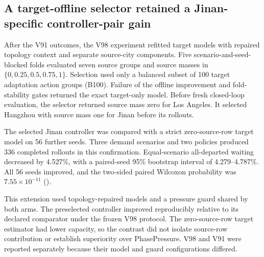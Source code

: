 \subsection{A target-offline selector retained a Jinan-specific controller-pair gain}

After the V91 outcomes, the V98 experiment refitted target models with repaired
topology context and separate source-city components.  Five
scenario-and-seed-blocked folds evaluated seven source groups and source masses
in $\{0,0.25,0.5,0.75,1\}$.  Selection used only a balanced subset of 100 target
adaptation action groups (B100).  Failure of the offline improvement and
fold-stability gates returned the exact target-only model.  Before fresh
closed-loop evaluation, the selector returned source mass zero for Los Angeles.
It selected Hangzhou with source mass one for Jinan before its rollouts.

The selected Jinan controller was compared with a strict zero-source-row
target model on 56 further seeds.  Three demand scenarios and two policies
produced 336 completed rollouts in this confirmation.  Equal-scenario
all-departed waiting decreased by 4.527\%, with a paired-seed 95\% bootstrap
interval of 4.279--4.787\%.  All 56 seeds improved, and the two-sided paired
Wilcoxon probability was $7.55\times10^{-11}$
().

This extension used topology-repaired models and a pressure guard shared by
both arms.  The preselected controller improved reproducibly relative to its
declared comparator under the frozen V98 protocol.  The zero-source-row target
estimator had lower capacity, so the contrast did not isolate source-row
contribution or establish superiority over PhasePressure.  V98 and V91 were
reported separately because their model and guard configurations differed.

\begin{table}[t]
\caption{Jinan-specific controller comparisons under two separate frozen
protocols.  V91 compares the original V43 controller with its legacy
near-target-only arm.  V98 compares the subsequently selected controller with
a strict zero-source-row target model of lower capacity.  Results remain
separate, and the V98 contrast measures controller-pair performance without
isolating source-row contribution.}
\label{tab:jinan-conditional-source-transfer}
\centering
\scriptsize
\resizebox{\textwidth}{!}{}
\end{table}
\FloatBarrier

